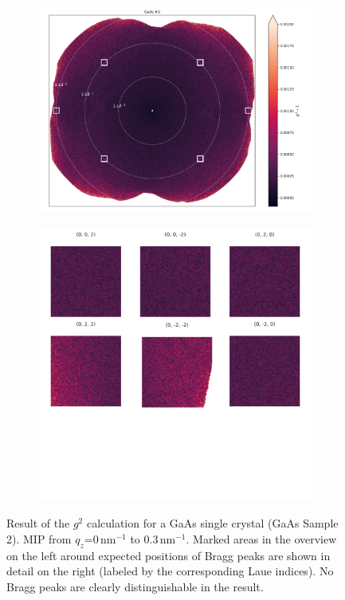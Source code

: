 \begin{figure}[hp!]
	\centering
	\begin{subfigure}[b]{0.55\textwidth}
		\includegraphics[width=\linewidth]{images/gaas2_overview.pdf}
	\end{subfigure}
	\begin{subfigure}[b]{0.4\textwidth}
		\includegraphics[width=\linewidth]{images/gaas2_zoom.pdf}
	\end{subfigure}
	\caption[Results GaAs Sample 2]{Result of the $g^2$  calculation for a GaAs single crystal (GaAs Sample 2).  MIP from $q_z$=0\,nm$^{-1}$ to 0.3\,nm$^{-1}$. Marked areas in the overview on the left around expected positions of Bragg peaks are shown in detail on the right (labeled by the corresponding Laue indices). No Bragg peaks are  clearly distinguishable in the result.}
	\label{fig:resgaas2}
\end{figure}


